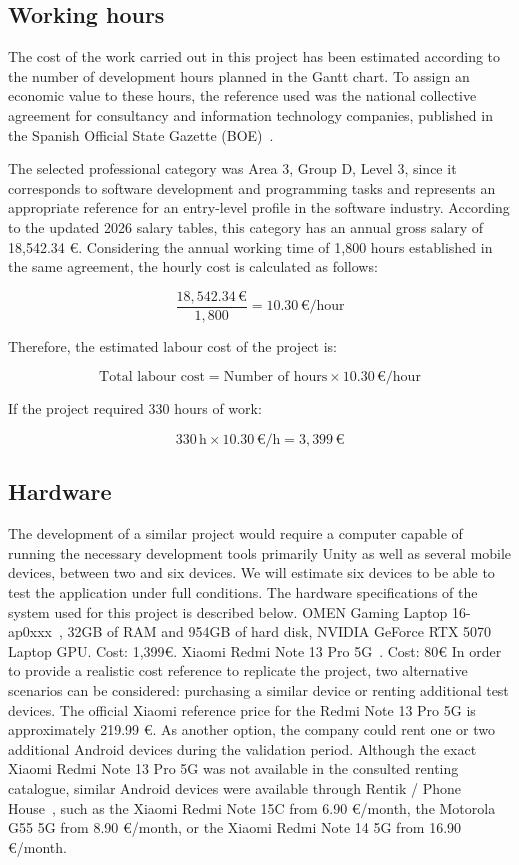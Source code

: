 \subsection{Working hours}
The cost of the work carried out in this project has been estimated according to the number of development hours planned in the Gantt chart.  To assign an economic value to these hours, the reference used was the national collective agreement for consultancy and information technology companies, published in the Spanish Official State Gazette (BOE)~\cite{boe_convenio}.


The selected professional category was Area 3, Group D, Level 3, since it corresponds to software development and programming tasks and represents an appropriate reference for an entry-level profile in the software industry.
According to the updated 2026 salary tables, this category has an annual gross salary of 18,542.34 €. Considering the annual working time of 1,800 hours established in the same agreement, the hourly cost is calculated as follows:


\[
\frac{18{,}542.34\,\text{€}}{1{,}800} = 10.30\,\text{€/hour}
\]

Therefore, the estimated labour cost of the project is: 

\[
\text{Total labour cost} = \text{Number of hours} \times 10.30\,\text{€/hour}
\]

If the project required 330 hours of work: 

 \[
330\,\text{h} \times 10.30\,\text{€/h} = 3,399\,\text{€}
\]

\subsection{Hardware}
The development of a similar project would require a computer capable of running the necessary development tools primarily Unity as well as several mobile devices, between two and six devices. We will estimate six devices to be able to test the application under full conditions. The hardware specifications of the system used for this project is described below.
OMEN Gaming Laptop 16-ap0xxx~\cite{hp_omen}, 32GB of RAM and 954GB of hard disk, NVIDIA GeForce RTX 5070 Laptop GPU. Cost: 1,399€.
Xiaomi Redmi Note 13 Pro 5G~\cite{redmi_note}. Cost: 80€
In order to provide a realistic cost reference to replicate the project, two alternative scenarios can be considered: purchasing a similar device or renting additional test devices.
The official Xiaomi reference price for the Redmi Note 13 Pro 5G is approximately 219.99 €. As another option, the company could rent one or two additional Android devices during the validation period. Although the exact Xiaomi Redmi Note 13 Pro 5G was not available in the consulted renting catalogue, similar Android devices were available through Rentik / Phone House~\cite{rentik}, such as the Xiaomi Redmi Note 15C from 6.90 €/month, the Motorola G55 5G from 8.90 €/month, or the Xiaomi Redmi Note 14 5G from 16.90 €/month.

